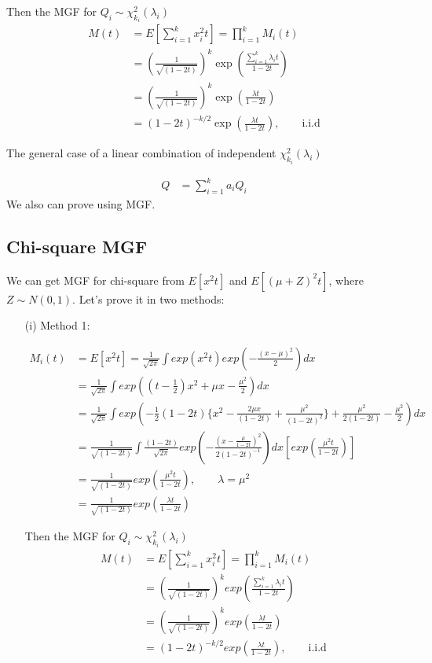 \begin{itemize}
Then the MGF for $Q_i \sim \chi^2 _{k_i}(\lambda_i)$
\begin{align*}
	M(t) &= E[ \sum_{i=1}^k x_i^2 t] = \prod_{i=1}^k M_i(t) \\
	&=\left(\frac{1}{\sqrt{(1-2t)}} \right)^k \exp \left( \frac{ \sum_{i=1}^k \lambda_i t }{1-2t} \right)\\
	&=\left(\frac{1}{\sqrt{(1-2t)}} \right)^k \exp \left( \frac{ \lambda t }{1-2t} \right)\\
	&= (1-2t)^{-k/2} \exp \left( \frac{ \lambda t }{1-2t} \right), \qquad \text{i.i.d}
\end{align*}

The general case of a linear combination of independent $\chi^2_{k_i}(\lambda_i)$

\begin{align*}
	Q &= \sum_{i=1}^k a_i Q_i
\end{align*}
We also can prove using MGF.


\subsection{Chi-square MGF}
We can get MGF for chi-square from $E[x^2 t]$ and $E[(\mu + Z)^2 t]$, where $Z \sim N(0,1)$.
Let's prove it in two methods:
\begin{itemize}
	\item [(i)] Method 1:
	
	\begin{align*}
		M_i(t) &= E[x^2 t] = \frac{1}{\sqrt{2\pi}} \int exp(x^2 t) exp \left( - \frac{(x-\mu)^2}{2} \right) dx\\
		&=  \frac{1}{\sqrt{2\pi}}  \int exp \left( (t- \frac{1}{2}) x^2 + \mu x -\frac{\mu^2}{2} \right) dx \\
		&=  \frac{1}{\sqrt{2\pi}}  \int exp \left(  -\frac{1}{2}(1-2t) \{ x^2 - \frac{2 \mu x}{(1-2t)} + \frac{\mu^2}{(1-2t)^2} \} + \frac{\mu^2}{2(1-2t)} -\frac{\mu^2}{2}  \right) dx \\
		&= \frac{1}{\sqrt{(1-2t)}} \int \frac{(1-2t)}{\sqrt{2\pi}} exp\left( -\frac{(x-\frac{\mu}{1-2t})^2}{2 (1-2t)^{-1}} \right) dx \left[exp \left( \frac{\mu^2 t}{1-2t} \right) \right]\\
		&=\frac{1}{\sqrt{(1-2t)}} exp \left( \frac{\mu^2 t}{1-2t} \right), \qquad \lambda = \mu^2\\
		&=\frac{1}{\sqrt{(1-2t)}} exp \left( \frac{\lambda t}{1-2t} \right)
	\end{align*}
	
	Then the MGF for $Q_i \sim \chi^2 _{k_i}(\lambda_i)$
	\begin{align*}
		M(t) &= E[ \sum_{i=1}^k x_i^2 t] = \prod_{i=1}^k M_i(t) \\
		&=\left(\frac{1}{\sqrt{(1-2t)}} \right)^k exp \left( \frac{ \sum_{i=1}^k \lambda_i t }{1-2t} \right)\\
		&=\left(\frac{1}{\sqrt{(1-2t)}} \right)^k exp \left( \frac{ \lambda t }{1-2t} \right)\\
		&= (1-2t)^{-k/2} exp \left( \frac{ \lambda t }{1-2t} \right), \qquad \text{i.i.d}
	\end{align*}
	

\end{itemize}
\end{itemize}

